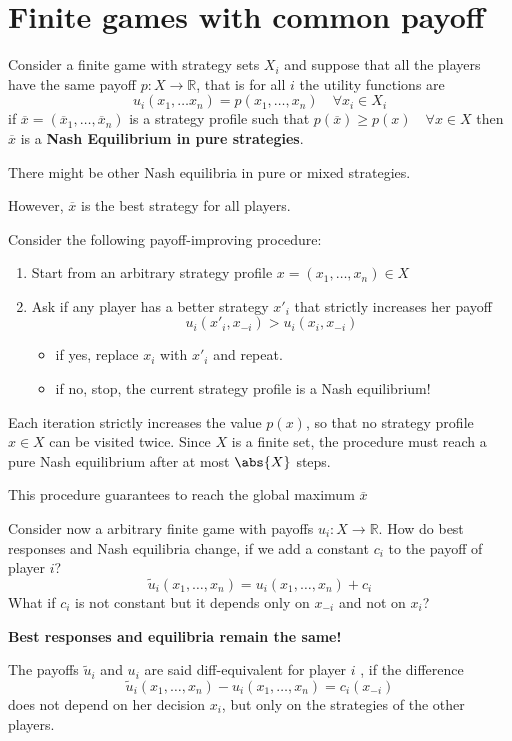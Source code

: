 \documentclass[../main.tex]{subfiles}
\begin{document}
\section{Finite games with common payoff}
Consider a finite game with strategy sets $X_i$ and suppose that all the players have the same payoff $p : X \to \mathbb{R}$, that is for all $i$ the utility functions are
\[
    u_i (x_1, \ldots x_n) = p(x_1, \ldots, x_n) \quad \forall x_i \in X_i
\]
if $\overline{x} = (\overline{x}_1, \ldots, \overline{x}_n)$ is a strategy profile such that $p(\overline{x}) \geq p(x) \quad \forall x \in X$ then $\overline{x}$ is a \textbf{Nash Equilibrium in pure strategies}.
\begin{remark}
    There might be other Nash equilibria in pure or mixed strategies.

    However, $\overline{x}$ is the best strategy for all players.
\end{remark}
Consider the following payoff-improving procedure:
\begin{enumerate}
    \item Start from an arbitrary strategy profile $x = (x_1, \ldots, x_n) \in X$
    \item Ask if any player has a better strategy $x'_i$ that strictly increases her payoff
          \[
              u_i(x'_i, x_{-i}) > u_i(x_i, x_{-i})
          \]
          \begin{itemize}
              \item if yes, replace $x_i$ with $x'_i$ and repeat.
              \item if no, stop, the current strategy profile is a Nash equilibrium!
          \end{itemize}
\end{enumerate}
Each iteration strictly increases the value $p(x)$, so that no strategy profile $x \in X$ can be visited twice. Since $X$ is a finite set, the procedure must reach a pure Nash equilibrium after at most $\abs{X}$ steps.
\begin{remark}
    This procedure guarantees to reach the global maximum $\overline{x}$
\end{remark}
Consider now a arbitrary finite game with payoffs $u_i : X \to \mathbb{R}$. How do best responses and Nash equilibria change, if we add a constant $c_i$ to the payoff of player $i$?
\[
    \tilde{u}_i(x_1, \ldots, x_n) = u_i(x_1, \ldots, x_n) + c_i
\]
What if $c_i$ is not constant but it depends only on $x_{-i}$ and not on $x_i$?
\begin{center}
    \textbf{Best responses and equilibria remain the same!}
\end{center}
The payoffs $\tilde{u}_i$ and $u_i$ are said diff-equivalent for player $i$ , if the difference
\[
    \tilde{u}_i(x_1, \ldots, x_n) - u_i(x_1, \ldots, x_n) = c_i(x_{-i})
\]
does not depend on her decision $x_i$, but only on the strategies of the other players.
\end{document}
